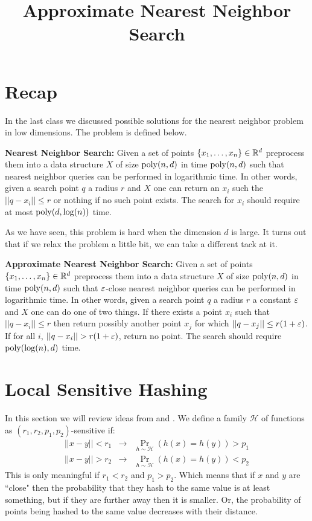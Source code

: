 \documentclass{article}
\title{Approximate Nearest Neighbor Search}
\date{\nonumber}
\begin{document}
\maketitle

\section{Recap}
In the last class we discussed possible solutions for the nearest neighbor problem in low dimensions.
The problem is defined below.
\begin{definition}{\bf Nearest Neighbor Search:} Given a set of points $\{x_1,\ldots,x_n\} \in {\mathbb{R}}^{d}$ 
preprocess them into a data structure
$X$ of size ${\operatorname{poly}}(n,d)$ in time ${\operatorname{poly}}(n,d)$ such that nearest neighbor queries can
be performed in logarithmic time. In other words, given a search point $q$ a radius $r$ and $X$ one can 
return an $x_i$ such the $||q - x_i || \le r$ or nothing if no such point exists.  The search for $x_i$ should
require at most ${\operatorname{poly}}(d,\log(n))$ time.
\end{definition}

As we have seen, this problem is hard when the dimension $d$ is large.
It turns out that if we relax the problem a little bit, we can take a different tack at it.
\begin{definition}
{\bf Approximate Nearest Neighbor Search:} Given a set of points $\{x_1,\ldots,x_n\} \in {\mathbb{R}}^{d}$ 
preprocess them into a data structure
$X$ of size ${\operatorname{poly}}(n ,d)$ in time ${\operatorname{poly}}(n ,d)$ such that $\varepsilon$-close nearest neighbor queries can
be performed in logarithmic time. In other words, given a search point $q$ a radius $r$ a constant $\varepsilon$ and $X$ one can 
do one of two things. If there exists a point $x_i$ such that $||q - x_i || \le r$ then return possibly another point $x_j$ for which 
$||q - x_j || \le r(1+\varepsilon)$. If for all $i$, $||q - x_i || > r(1+\varepsilon)$, return no point.
The search should require ${\operatorname{poly}}(\log(n),d)$ time.
\end{definition}

\section{Local Sensitive Hashing}
In this section we will review ideas from \cite{Charikar02} and \cite{GionisIM99}.
We define a family $\mathcal{H}$
of functions as $(r_1,r_2,p_1,p_2)$-sensitive if:
\begin{eqnarray*} 
|| x- y || < r_1 &\rightarrow& \Pr_{h \sim \mathcal{H}}(h(x)=h(y)) > p_1\\
|| x- y || > r_2 &\rightarrow& \Pr_{h \sim \mathcal{H}}(h(x)=h(y)) < p_2
\end{eqnarray*}
This is only meaningful if $r_1 < r_2$ and $p_1 > p_2$.
Which means that if $x$ and $y$ are ``close" then the probability that
they hash to the same value is at least something, but if they are further away
then it is smaller. Or, the probability of points being hashed to the same value 
decreases with their distance.
\end{document}
